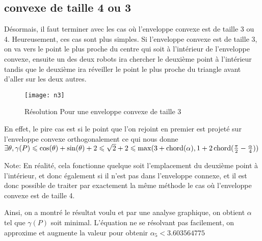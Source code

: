 \subsection{convexe de taille 4 ou 3}

Désormais, il faut terminer avec les cas où l'enveloppe convexe est de taille 3 ou 4. Heureusement, ces cas sont plus simples.
Si l'enveloppe convexe est de taille 3, on va vers le point le plus proche du centre qui soit à l'intérieur de l'enveloppe convexe, ensuite un des deux robots ira chercher le deuxième point à l'intérieur tandis que le deuxième ira réveiller le point le plus proche du triangle avant d'aller sur les deux autres.

\begin{figure}[h!]
  \centering
  \texttt{[image: n3]}
  \caption{Résolution Pour une enveloppe convexe de taille 3}
  \label{fig:n3}
\end{figure}

En effet, le pire cas est si le point que l'on rejoint en premier est projeté sur l'enveloppe convexe orthogonalement ce qui nous donne $\exists \theta, \gamma(P) \leqslant \cos(\theta) + \sin(\theta) + 2 \leqslant \sqrt{2} + 2 \leqslant \max(3 + \operatorname{chord}(\alpha), 1 + 2\operatorname{chord}(\frac{\pi}{2} - \frac{\alpha}{4}))$

Note: En réalité, cela fonctionne quelque soit l'emplacement du deuxième point à l'intérieur, et donc également si il n'est pas dans l'enveloppe connexe, et il est donc possible de traiter par exactement la même méthode le cas où l'enveloppe convexe est de taille 4.

Ainsi, on a montré le résultat voulu et par une analyse graphique, on obtient $\alpha$ tel que $\gamma(P)$ soit minimal. L'équation ne se résolvant pas facilement, on approxime et augmente la valeur pour obtenir \(\alpha_5 < 3.603564775\)